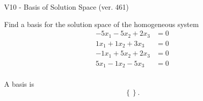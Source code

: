 \begin{exercise}
  \begin{exerciseTitle}V10 - Basis of Solution Space (ver. 461)\end{exerciseTitle}
  \begin{exerciseStatement}
    Find a basis for the solution space of the homogeneous system 
\begin{align*}
 -5 x_ 1 -5 x_ 2 + 2 x_ 3 &= 0  \\ 
  1 x_ 1 + 1 x_ 2 + 3 x_ 3 &= 0  \\ 
  -1 x_ 1 + 5 x_ 2 + 2 x_ 3 &= 0  \\ 
  5 x_ 1 -1 x_ 2 -5 x_ 3 &= 0  \\ 
 \end{align*}


 
  \end{exerciseStatement}

  \begin{exerciseAnswer}
   A basis is   
\[\left\{\right\}.\]

  


  \end{exerciseAnswer}
\end{exercise}